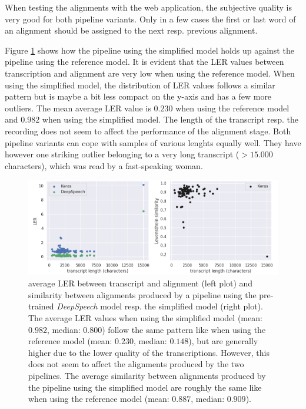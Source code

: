 When testing the alignments with the web application, the subjective quality is very good for both pipeline variants. Only in a few cases the first or last word of an alignment should be assigned to the next resp. previous alignment.

Figure \ref{pipeline_scatterplot_ls_en} shows how the pipeline using the simplified model holds up against the pipeline using the reference model. It is evident that the \ac{LER} values between transcription and alignment are very low when using the reference model. When using the simplified model, the distribution of \ac{LER} values follows a similar pattern but is maybe a bit less compact on the y-axis and has a few more outliers. The mean average \ac{LER} value is $0.230$ when using the reference model and $0.982$ when using the simplified model. The length of the transcript resp. the recording does not seem to affect the performance of the alignment stage. Both pipeline variants can cope with samples of various lenghts equally well. They have however one striking outlier belonging to a very long transcript ($>15.000$ characters), which was read by a fast-speaking woman. 

\begin{figure}[h!]
	\includegraphics[width=\linewidth]{./img/scatterplot_ls.png}
	\caption{average \ac{LER} between transcript and alignment (left plot) and similarity between alignments produced by a pipeline using the pre-trained \textit{DeepSpeech} model resp. the simplified model (right plot). The average \ac{LER} values when using the simplified model (mean: $0.982$, median: $0.800$) follow the same pattern like when using the reference model (mean: $0.230$, median: $0.148$), but are generally higher due to the lower quality of the transcriptions. However, this does not seem to affect the alignments produced by the two pipelines. The average similarity between alignments produced by the pipeline using the simplified model are roughly the same like when using the reference model (mean: $0.887$, median: $0.909$).}
	\label{pipeline_scatterplot_ls_en}
\end{figure}

